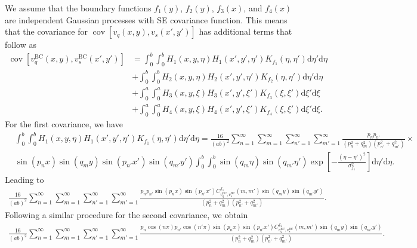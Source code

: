 \documentclass[a4paper,10pt]{article}
\newcommand{\dif}{\textrm{d}}
\DeclareMathOperator{\cov}{cov} \DeclareMathOperator{\ex}{E}
\begin{document}
We assume that the boundary functions $f_1(y)$, $f_2(y)$, $f_3(x)$, and $f_4(x)$ are
independent Gaussian processes with SE covariance function. This means that the
covariance for $\cov\left[v_q(x,y),v_s(x',y')\right]$ has additional terms that follow as
  \begin{align*}
    \cov\left[v^{\text{BC}}_q(x,y),v^{\text{BC}}_s(x',y')\right] & =
    \int_0^b\int_0^bH_1(x, y, \eta)H_1(x', y', \eta')K_{f_1}(\eta, \eta')\dif\eta'
    \dif\eta\\
    &+ \int_0^b\int_0^bH_2(x, y, \eta)H_2(x', y', \eta')K_{f_2}(\eta, \eta')\dif\eta'\dif\eta\\
    & + \int_0^a\int_0^aH_3(x, y, \xi)H_3(x', y', \xi')K_{f_3}(\xi, \xi')\dif\xi'
    \dif\xi\\
    &+\int_0^a\int_0^aH_4(x, y, \xi)H_4(x', y', \xi')K_{f_4}(\xi, \xi')\dif\xi'\dif\xi.
  \end{align*}  
For the first covariance, we have
\begin{align*}   
  &  \int_0^b\int_0^bH_1(x, y, \eta)H_1(x', y', \eta')K_{f_1}(\eta, \eta')\dif\eta'
    \dif\eta  = \frac{16}{(ab)^2}\sum_{n=1}^\infty
                  \sum_{m=1}^\infty \sum_{n'=1}^\infty
                  \sum_{m'=1}^\infty\frac{p_n p_{n'}}{(p_n^2 + q_m^2)(p_{n'}^2 + q_{m'}^2)}
                  \times \\
  & \sin\left({p_n x}\right) \sin\left(q_m y\right)\sin\left({p_{n'} x'}\right)
                  \sin\left(q_{m'} y'\right)\int_0^b\int_0^b
                  \sin\left(q_m \eta\right)\sin\left(q_{m'} \eta'\right)
                  \exp\left[-\frac{\left(\eta-\eta'\right)^2}{\sigma^2_{f_1}}\right]\dif\eta'\dif\eta. 
\end{align*}
Leading to
\begin{align*}   
\frac{16}{(ab)^2}\sum_{n=1}^\infty\sum_{m=1}^\infty \sum_{n'=1}^\infty
\sum_{m'=1}^\infty\frac{p_n p_{n'}\sin\left(p_n x\right)\sin\left(p_{n'} x'\right)
      C^{f_1}_{v^{\text{BC}}_q,v^{\text{BC}}_s}(m,m')\sin\left(q_m y\right)\sin\left(q_{m'} y'\right)}
    {(p_n^2 + q_m^2)(p_{n'}^2 + q_{m'}^2)}.
\end{align*}
Following a similar procedure for the second covariance, we obtain
\begin{align*}   
\frac{16}{(ab)^2}\sum_{n=1}^\infty\sum_{m=1}^\infty \sum_{n'=1}^\infty
\sum_{m'=1}^\infty\frac{p_n \cos(n\pi)p_{n'}\cos(n'\pi)\sin\left(p_n x\right)\sin\left(p_{n'} x'\right)
      C^{f_2}_{v^{\text{BC}}_q,v^{\text{BC}}_s}(m,m')\sin\left(q_m y\right)\sin\left(q_{m'} y'\right)}
    {(p_n^2 + q_m^2)(p_{n'}^2 + q_{m'}^2)}.
\end{align*}
\end{document}
